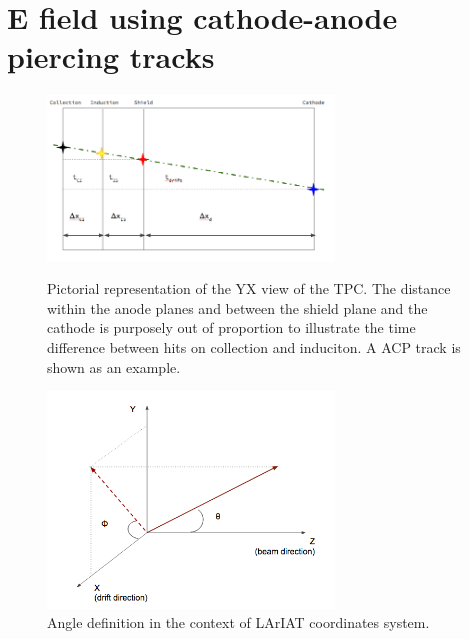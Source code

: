 \section{E field using cathode-anode piercing tracks}\label{sec:CAMethod}
\begin{figure}[b]
\centering
\begin{minipage}{0.45\textwidth}
\centering
\includegraphics[width=3in]{images/TPCCrossSectionView.png}
\caption{Pictorial representation of the YX view of the TPC. The distance within the anode planes and between the shield plane and the cathode is purposely out of proportion to illustrate the time difference between hits on collection and induciton. A ACP track is shown as an example.}
\label{fig:Scheme}
\end{minipage}\hfill
\begin{minipage}{0.45\textwidth}
\centering
\includegraphics[width=3in]{images/AngleDef.png}
\caption{Angle definition in the context of LArIAT coordinates system.}
\label{fig:AngleDef}
\end{minipage}
\end{figure}

